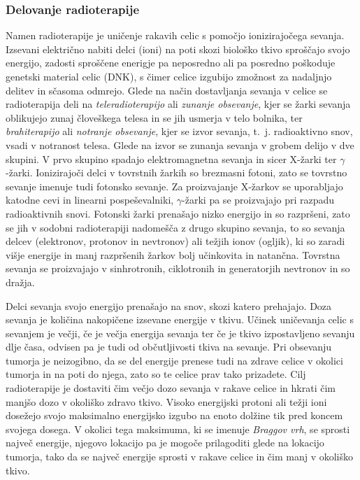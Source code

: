 \documentclass[a4paper,twoside,11pt]{article}
\begin{document}
	\subsubsection*{Delovanje radioterapije}
	\par{
	  Namen radioterapije je uničenje rakavih celic s pomočjo ionizirajočega sevanja. Izsevani električno nabiti delci (ioni) na poti skozi biološko tkivo sproščajo svojo energijo, zadosti sproščene enerigje pa neposredno ali pa posredno poškoduje genetski material celic (DNK), s čimer celice izgubijo zmožnost za nadaljnjo delitev in sčasoma odmrejo. Glede na način dostavljanja sevanja v celice se radioterapija deli na \emph{teleradioterapijo} ali \emph{zunanje obsevanje}, kjer se žarki sevanja oblikujejo zunaj človeškega telesa in se jih usmerja v telo bolnika, ter \emph{brahiterapijo} ali \emph{notranje obsevanje}, kjer se izvor sevanja, t.~j. radioaktivno snov, vsadi v notranost telesa. Glede na izvor se zunanja sevanja v grobem delijo v dve skupini. V prvo skupino spadajo elektromagnetna sevanja in sicer X-žarki ter $\gamma$-žarki. Ionizirajoči delci v tovrstnih žarkih so brezmasni fotoni, zato se tovrstno sevanje imenuje tudi fotonsko sevanje. Za proizvajanje X-žarkov se uporabljajo katodne cevi in linearni pospeševalniki, $\gamma$-žarki pa se proizvajajo pri razpadu radioaktivnih snovi. Fotonski žarki prenašajo nizko energijo in so razpršeni, zato se jih v sodobni radioterapiji nadomešča z drugo skupino sevanja, to so sevanja delcev (elektronov, protonov in nevtronov) ali težjih ionov (ogljik), ki so zaradi višje energije in manj razpršenih žarkov bolj učinkovita in natančna. Tovrstna sevanja se proizvajajo v sinhrotronih, ciklotronih in generatorjih nevtronov in so dražja. %
	}
	\par{
	  Delci sevanja svojo energijo prenašajo na snov, skozi katero prehajajo. Doza sevanja je količina nakopičene izsevane energije v tkivu. Učinek uničevanja celic s sevanjem je večji, če je večja energija sevanja ter če je tkivo izpostavljeno sevanju dlje časa, odvisen pa je tudi od občutljivosti tkiva na sevanje. Pri obsevanju tumorja je neizogibno, da se del energije prenese tudi na zdrave celice v okolici tumorja in na poti do njega, zato so te celice prav tako prizadete. Cilj radioterapije je dostaviti čim večjo dozo sevanja v rakave celice in hkrati čim manjšo dozo v okoliško zdravo tkivo. Visoko energijski protoni ali težji ioni dosežejo svojo maksimalno energijsko izgubo na enoto dolžine tik pred koncem svojega dosega. V okolici tega maksimuma, ki se imenuje \emph{Braggov vrh}, se sprosti največ energije, njegovo lokacijo pa je mogoče prilagoditi glede na lokacijo tumorja, tako da se največ energije sprosti v rakave celice in čim manj v okoliško tkivo.
	}
\end{document}
